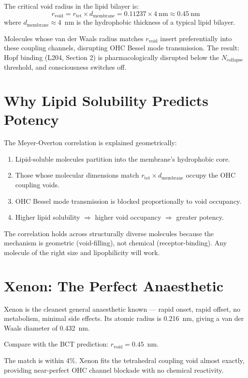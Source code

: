 \documentclass[aps,prl,twocolumn,superscriptaddress]{revtex4-2}
\begin{document}
The critical void radius in the lipid bilayer is:
\begin{equation}
r_{\mathrm{void}} = r_{\mathrm{tet}} \times d_{\mathrm{membrane}} = 0.11237 \times 4~\text{nm} \approx 0.45~\text{nm}
\end{equation}
where $d_{\mathrm{membrane}} \approx 4$~nm is the hydrophobic thickness of a typical lipid bilayer.

Molecules whose van der Waals radius matches $r_{\mathrm{void}}$ insert preferentially into these coupling channels, disrupting OHC Bessel mode transmission. The result: Hopf binding (L204, Section 2) is pharmacologically disrupted below the $N_{\mathrm{collapse}}$ threshold, and consciousness switches off.

\section{Why Lipid Solubility Predicts Potency}

The Meyer-Overton correlation is explained geometrically:
\begin{enumerate}
\item Lipid-soluble molecules partition into the membrane's hydrophobic core.
\item Those whose molecular dimensions match $r_{\mathrm{tet}} \times d_{\mathrm{membrane}}$ occupy the OHC coupling voids.
\item OHC Bessel mode transmission is blocked proportionally to void occupancy.
\item Higher lipid solubility $\Rightarrow$ higher void occupancy $\Rightarrow$ greater potency.
\end{enumerate}

The correlation holds across structurally diverse molecules because the mechanism is geometric (void-filling), not chemical (receptor-binding). Any molecule of the right size and lipophilicity will work.

\section{Xenon: The Perfect Anaesthetic}

Xenon is the cleanest general anaesthetic known --- rapid onset, rapid offset, no metabolism, minimal side effects. Its atomic radius is 0.216~nm, giving a van der Waals diameter of 0.432~nm.

Compare with the BCT prediction: $r_{\mathrm{void}} = 0.45$~nm.

The match is within 4\%. Xenon fits the tetrahedral coupling void almost exactly, providing near-perfect OHC channel blockade with no chemical reactivity.
\end{document}
